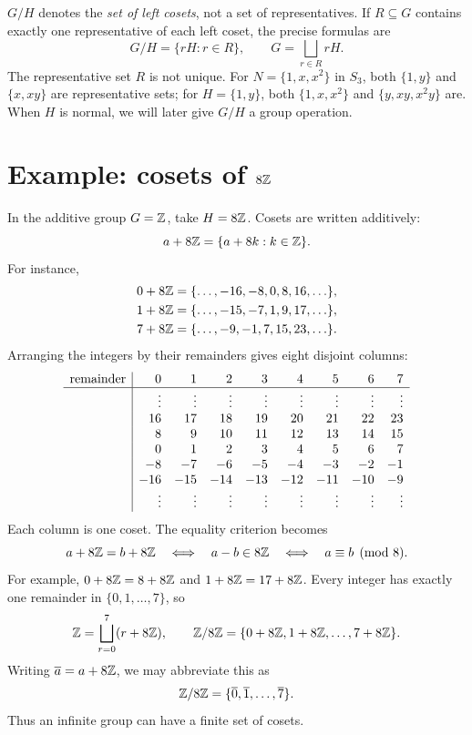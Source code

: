 \documentclass[reqno,11pt]{amsart}
\begin{document}
\begin{warningbox}
$G/H$ denotes the \emph{set of left cosets}, not a set of representatives.
If $R\subseteq G$ contains exactly one representative of each left coset,
the precise formulas are
\begin{equation}
  G/H=\{rH:r\in R\},\qquad G=\bigsqcup_{r\in R}rH.
\end{equation}
The representative set $R$ is not unique. For $N=\{1,x,x^2\}$ in $S_3$,
both $\{1,y\}$ and $\{x,xy\}$ are representative sets; for $H=\{1,y\}$,
both $\{1,x,x^2\}$ and $\{y,xy,x^2y\}$ are. When $H$ is normal, we will
later give $G/H$ a group operation.
\end{warningbox}

\section{Example: cosets of \texorpdfstring{$8\mathbb{Z}$}{8Z}}\label{sec:8Z}

In the additive group $G=\mathbb{Z}$, take $H=8\mathbb{Z}$. Cosets are written additively:
\begin{equation}
  a+8\mathbb{Z}=\{a+8k:k\in\mathbb{Z}\}.
\end{equation}
For instance,
\begin{align*}
  0+8\mathbb{Z}&=\{\ldots,-16,-8,0,8,16,\ldots\},\\
  1+8\mathbb{Z}&=\{\ldots,-15,-7,1,9,17,\ldots\},\\
  7+8\mathbb{Z}&=\{\ldots,-9,-1,7,15,23,\ldots\}.
\end{align*}
Arranging the integers by their remainders gives eight disjoint columns:
\[
\begin{array}{c|rrrrrrrr}
  \text{remainder}&0&1&2&3&4&5&6&7\\ \hline
  &\vdots&\vdots&\vdots&\vdots&\vdots&\vdots&\vdots&\vdots\\
  &16&17&18&19&20&21&22&23\\
  &8&9&10&11&12&13&14&15\\
  &0&1&2&3&4&5&6&7\\
  &-8&-7&-6&-5&-4&-3&-2&-1\\
  &-16&-15&-14&-13&-12&-11&-10&-9\\
  &\vdots&\vdots&\vdots&\vdots&\vdots&\vdots&\vdots&\vdots
\end{array}
\]
Each column is one coset. The equality criterion becomes
\begin{equation}
  a+8\mathbb{Z}=b+8\mathbb{Z}
  \quad\Longleftrightarrow\quad a-b\in8\mathbb{Z}
  \quad\Longleftrightarrow\quad a\equiv b\pmod8.
\end{equation}
For example, $0+8\mathbb{Z}=8+8\mathbb{Z}$ and $1+8\mathbb{Z}=17+8\mathbb{Z}$.
Every integer has exactly one remainder in $\{0,1,\ldots,7\}$, so
\[
  \mathbb{Z}=\bigsqcup_{r=0}^7(r+8\mathbb{Z}),\qquad
  \mathbb{Z}/8\mathbb{Z}=\{0+8\mathbb{Z},1+8\mathbb{Z},\ldots,7+8\mathbb{Z}\}.
\]
Writing $\overline a=a+8\mathbb{Z}$, we may abbreviate this as
\[
  \mathbb{Z}/8\mathbb{Z}=\{\overline0,\overline1,\ldots,\overline7\}.
\]
Thus an infinite group can have a finite set of cosets.
\end{document}
